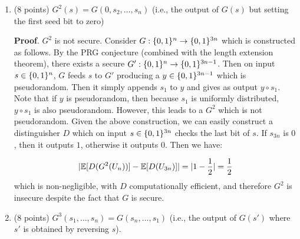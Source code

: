 \documentclass{article}
\begin{document}
\begin{enumerate}[,start=2]
\begin{enumerate}[noitemsep,topsep=\mdcompacttopsep,label=\alph*.]
\item{}(8 points) $G^2(s)=G(0,s_2,\ldots,s_n)$ (i.e., the output of $G(s)$ but setting the first seed bit to zero)

\begin{mdbmarginx}{1ex}{0pt}{1ex}{0pt}%
\noindent{}\textbf{Proof}.  $G^2$ is not secure. Consider $G: \{0,1\}^n \to \{0,1\}^{3n}$ which is constructed as follows. By the PRG 
conjecture (combined with the length extension theorem), there exists a secure $G': \{0,1\}^n \to \{0,1\}^{3n - 1}$.
Then on input $s \in \{0,1\}^n$, $G$ feeds $s$ to $G'$ producing a $y \in \{0,1\}^{3n-1}$ which is pseudorandom. Then
it simply appends $s_1$ to $y$ and gives as output $y \circ s_1$. Note that if $y$ is pseudorandom, 
then because $s_1$ is uniformly distributed, $y \circ s_1$ is also pseudorandom. However, this 
leads to a $G^2$ which is not pseudorandom. Given the above construction, we can easily construct
a distinguisher $D$ which on input $s \in \{0,1\}^{3n}$ checks the last bit of $s$. If $s_{3n}$ is $0$, 
then it outputs $1$, otherwise it outputs $0$. Then we have:%
\end{mdbmarginx}%
\noindent\noindent\[%
|\E[D(G^2(U_n))] - \E[D(U_{3n})] | = |1 - \frac{1}{2}| = \frac{1}{2}
\]%
which is non-negligible, with $D$ computationally efficient, and therefore $G^2$ is insecure despite
the fact that $G$ is secure.
\mdfloatright{\ensuremath{\Box}}%

\item{}(8 points) $G^3(s_1,\ldots,s_n)=G(s_n,\ldots,s_1)$ (i.e., the output of $G(s')$ where $s'$ is obtained by reversing $s$).


\end{enumerate}
\end{enumerate}
\end{document}
